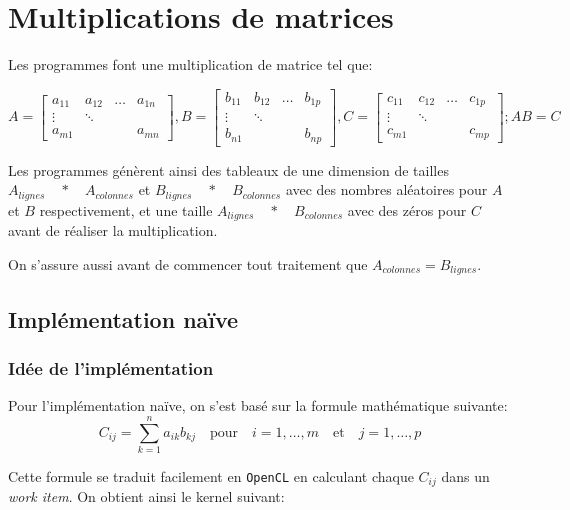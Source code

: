 \section{Multiplications de matrices}\label{sec:matrixmultiplication}

Les programmes font une multiplication de matrice tel que:

\[
A = \begin{bmatrix} 
    a_{11} & a_{12} & \dots & a_{1n}\\
    \vdots & \ddots &  \\
    a_{m1} &        & & a_{mn} 
    \end{bmatrix}
    ,
B = \begin{bmatrix} 
    b_{11} & b_{12} & \dots & b_{1p}\\
    \vdots & \ddots &  \\
    b_{n1} &        & & b_{np} 
    \end{bmatrix}
    ,
C = \begin{bmatrix} 
    c_{11} & c_{12} & \dots & c_{1p}\\
    \vdots & \ddots &  \\
    c_{m1} &        &  & c_{mp} 
    \end{bmatrix}
    ;
    AB = C
\]

Les programmes génèrent ainsi des tableaux de une dimension de tailles 
$A_{lignes} \quad * \quad A_{colonnes}$ et $B_{lignes} \quad * \quad B_{colonnes}$
avec des nombres aléatoires pour $A$ et $B$ respectivement, 
et une taille $A_{lignes} \quad * \quad B_{colonnes}$ avec des zéros pour $C$ avant 
de réaliser la multiplication.

On s'assure aussi avant de commencer tout traitement que $A_{colonnes} = B_{lignes}$.

\subsection{Implémentation naïve}  

\subsubsection{Idée de l'implémentation}

Pour l'implémentation naïve, on s'est basé sur la formule mathématique suivante:
\[
    C_{ij} = \sum_{k=1}^{n} a_{ik}b_{kj}\quad\textrm{pour}\quad i = 1, \dots, m\quad \textrm{et}\quad j = 1,\dots,p
\]

Cette formule se traduit facilement en \texttt{OpenCL} en calculant chaque $C_{ij}$ dans un \textit{work item}. 
On obtient ainsi le kernel suivant:

